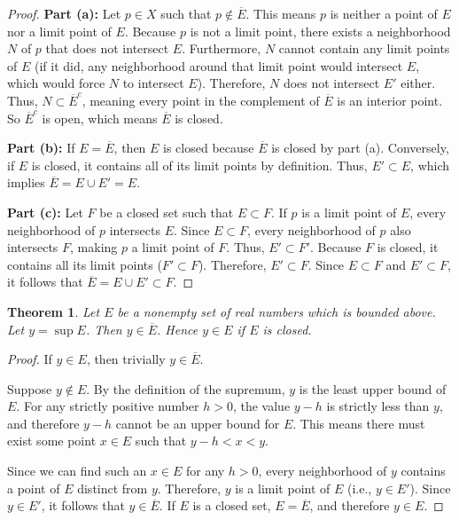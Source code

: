 \documentclass{article}
\theoremstyle{mythm}
\newtheorem{theorem}{Theorem}[section]
\begin{document}
\begin{proof}
\textbf{Part (a):} Let $p \in X$ such that $p \notin \overline{E}$. This means $p$ is neither a point of $E$ nor a limit point of $E$. Because $p$ is not a limit point, there exists a neighborhood $N$ of $p$ that does not intersect $E$. Furthermore, $N$ cannot contain any limit points of $E$ (if it did, any neighborhood around that limit point would intersect $E$, which would force $N$ to intersect $E$). Therefore, $N$ does not intersect $E'$ either. Thus, $N \subset \overline{E}^c$, meaning every point in the complement of $\overline{E}$ is an interior point. So $\overline{E}^c$ is open, which means $\overline{E}$ is closed.

\textbf{Part (b):} If $E = \overline{E}$, then $E$ is closed because $\overline{E}$ is closed by part (a). Conversely, if $E$ is closed, it contains all of its limit points by definition. Thus, $E' \subset E$, which implies $\overline{E} = E \cup E' = E$.

\textbf{Part (c):} Let $F$ be a closed set such that $E \subset F$. If $p$ is a limit point of $E$, every neighborhood of $p$ intersects $E$. Since $E \subset F$, every neighborhood of $p$ also intersects $F$, making $p$ a limit point of $F$. Thus, $E' \subset F'$. Because $F$ is closed, it contains all its limit points ($F' \subset F$). Therefore, $E' \subset F$. Since $E \subset F$ and $E' \subset F$, it follows that $\overline{E} = E \cup E' \subset F$.
\end{proof}

\begin{theorem}
Let $E$ be a nonempty set of real numbers which is bounded above. Let $y = \sup E$. Then $y \in \overline{E}$. Hence $y \in E$ if $E$ is closed.
\end{theorem}

\begin{proof}
If $y \in E$, then trivially $y \in \overline{E}$. 

Suppose $y \notin E$. By the definition of the supremum, $y$ is the least upper bound of $E$. For any strictly positive number $h > 0$, the value $y - h$ is strictly less than $y$, and therefore $y - h$ cannot be an upper bound for $E$. This means there must exist some point $x \in E$ such that $y - h < x < y$. 

Since we can find such an $x \in E$ for any $h > 0$, every neighborhood of $y$ contains a point of $E$ distinct from $y$. Therefore, $y$ is a limit point of $E$ (i.e., $y \in E'$). Since $y \in E'$, it follows that $y \in \overline{E}$. If $E$ is a closed set, $E = \overline{E}$, and therefore $y \in E$.
\end{proof}
\end{document}
